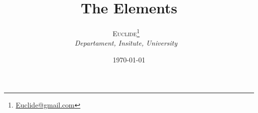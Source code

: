 \documentclass[12pt, a4paper, twocolumn, twoside, english] {article}
\title{The Elements}
\author{%
\Large\textsc{Euclide}\thanks{\href{mailto:Euclide@gmail.com}{Euclide@gmail.com} } ~\\[0ex]%
\large \itshape Departament, Insitute, University ~\\[0.5ex] %
}%
\date{\today}%
\begin{document}
%
\pagecolor{yellow!1!orange!3!}%
\maketitle%
\thispagestyle{fancytitle}%
\begin{onehalfspacing}%
%
\printbibliography%
\end{onehalfspacing}%
\end{document}

